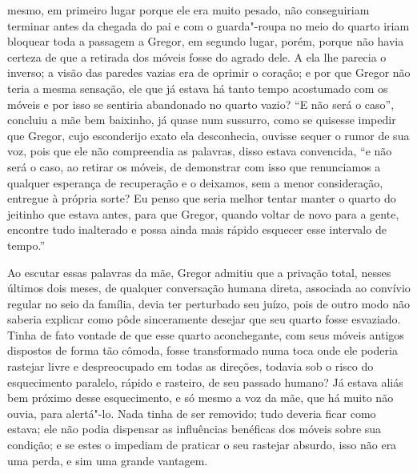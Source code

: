 mesmo, em primeiro lugar porque ele era muito pesado, não conseguiriam
terminar antes da chegada do pai e com o guarda"-roupa no meio do quarto
iriam bloquear toda a passagem a Gregor, em segundo lugar, porém, porque
não havia certeza de que a retirada dos móveis fosse do agrado dele. A ela
lhe parecia o inverso; a visão das paredes vazias era de oprimir o
coração; e por que Gregor não teria a mesma sensação, ele que já estava há
tanto tempo acostumado com os móveis e por isso se sentiria abandonado no
quarto vazio? “E não será o caso”, concluiu a mãe bem baixinho, já quase
num sussurro, como se quisesse impedir que Gregor, cujo esconderijo exato
ela desconhecia, ouvisse sequer o rumor de sua voz, pois que ele não
compreendia as palavras, disso estava convencida, “e não será o caso, ao
retirar os móveis, de demonstrar com isso que renunciamos a qualquer
esperança de recuperação e o deixamos, sem a menor consideração, entregue
à própria sorte? Eu penso que seria melhor tentar manter o quarto do
jeitinho que estava antes, para que Gregor, quando voltar de novo para a
gente, encontre tudo inalterado e possa ainda mais rápido esquecer esse
intervalo de tempo.”

Ao escutar essas palavras da mãe, Gregor admitiu que a privação total,
nesses últimos dois meses, de qualquer conversação humana direta,
associada ao convívio regular no seio da família, devia ter perturbado seu
juízo, pois de outro modo não saberia explicar como pôde sinceramente
desejar que seu quarto fosse esvaziado. Tinha de fato vontade de que esse
quarto aconchegante, com seus móveis antigos dispostos de forma tão
cômoda, fosse transformado numa toca onde ele poderia rastejar livre e
despreocupado em todas as direções, todavia sob o risco do esquecimento
paralelo, rápido e rasteiro, de seu passado humano? Já estava aliás bem
próximo desse esquecimento, e só mesmo a voz da mãe, que há muito não
ouvia, para alertá"-lo. Nada tinha de ser removido; tudo deveria ficar como
estava; ele não podia dispensar as influências benéficas dos móveis sobre
sua condição; e se estes o impediam de praticar o seu rastejar absurdo,
isso não era uma perda, e sim uma grande vantagem.

